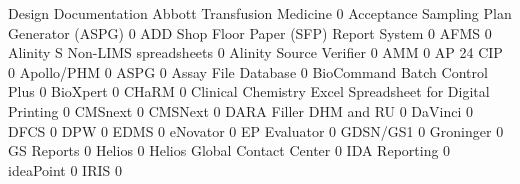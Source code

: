 \documentclass{article}
\begin{document}
\begin{Schunk}
\begin{Soutput}
                                                            Design Documentation
  Abbott Transfusion Medicine                                                  0
  Acceptance Sampling Plan Generator (ASPG)                                    0
  ADD Shop Floor Paper (SFP) Report System                                     0
  AFMS                                                                         0
  Alinity S Non-LIMS spreadsheets                                              0
  Alinity Source Verifier                                                      0
  AMM                                                                          0
  AP 24 CIP                                                                    0
  Apollo/PHM                                                                   0
  ASPG                                                                         0
  Assay File Database                                                          0
  BioCommand Batch Control Plus                                                0
  BioXpert                                                                     0
  CHaRM                                                                        0
  Clinical Chemistry Excel Spreadsheet for Digital Printing                    0
  CMSnext                                                                      0
  CMSNext                                                                      0
  DARA Filler DHM and RU                                                       0
  DaVinci                                                                      0
  DFCS                                                                         0
  DPW                                                                          0
  EDMS                                                                         0
  eNovator                                                                     0
  EP Evaluator                                                                 0
  GDSN/GS1                                                                     0
  Groninger                                                                    0
  GS Reports                                                                   0
  Helios                                                                       0
  Helios Global Contact Center                                                 0
  IDA Reporting                                                                0
  ideaPoint                                                                    0
  IRIS                                                                         0

\end{Soutput}
\end{Schunk}
\end{document}
